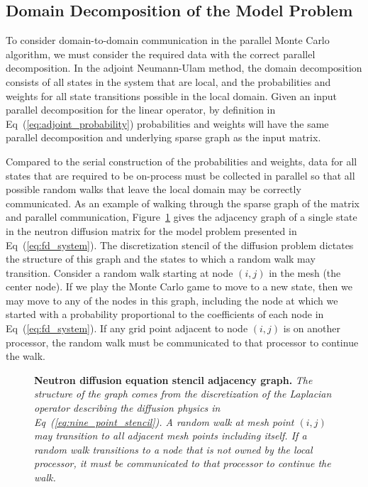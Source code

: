 \documentclass[preprint,11pt]{elsarticle}
\begin{document}
\subsection{Domain Decomposition of the Model Problem}
\label{subsec:model_problem_decomp}
To consider domain-to-domain communication in the parallel Monte Carlo
algorithm, we must consider the required data with the correct parallel
decomposition. In the adjoint Neumann-Ulam method, the domain decomposition
consists of all states in the system that are local, and the probabilities and
weights for all state transitions possible in the local domain. Given an input
parallel decomposition for the linear operator, by definition in
Eq~(\ref{eq:adjoint_probability}) probabilities and weights will have the same
parallel decomposition and underlying sparse graph as the input matrix.

Compared to the serial construction of the probabilities and weights, data for
all states that are required to be on-process must be collected in parallel so
that all possible random walks that leave the local domain may be correctly
communicated. As an example of walking through the sparse graph of the matrix
and parallel communication, Figure~\ref{fig:diffusion_graph} gives the
adjacency graph of a single state in the neutron diffusion matrix for the
model problem presented in Eq~(\ref{eq:fd_system}). The discretization stencil
of the diffusion problem dictates the structure of this graph and the states
to which a random walk may transition. Consider a random walk starting at node
$(i,j)$ in the mesh (the center node). If we play the Monte Carlo game to move
to a new state, then we may move to any of the nodes in this graph, including
the node at which we started with a probability proportional to the
coefficients of each node in Eq~(\ref{eq:fd_system}). If any grid point
adjacent to node $(i,j)$ is on another processor, the random walk must be
communicated to that processor to continue the walk.

\begin{figure}[ht!]
  \begin{center}
    \scalebox{1.25}{  }
  \end{center}
  \caption{\textbf{Neutron diffusion equation stencil adjacency graph.}
    \textit{The structure of the graph comes from the discretization of the
      Laplacian operator describing the diffusion physics in
      Eq~(\ref{eq:nine_point_stencil}). A random walk at mesh point $(i,j)$
      may transition to all adjacent mesh points including itself. If a
      random walk transitions to a node that is not owned by the local
      processor, it must be communicated to that processor to continue the
      walk.}}
  \label{fig:diffusion_graph}
\end{figure}
\end{document}
